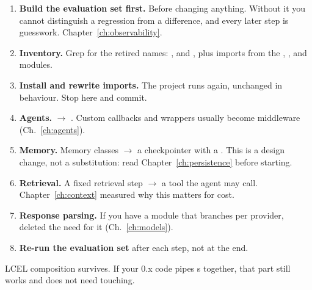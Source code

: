 \begin{enumerate}[leftmargin=1.4em]
\item \textbf{Build the evaluation set first.} Before changing anything. Without
      it you cannot distinguish a regression from a difference, and every later
      step is guesswork. Chapter~\ref{ch:observability}.
\item \textbf{Inventory.} Grep for the retired names: ,
       and , plus imports from the
      , ,  and 
      modules.
\item \textbf{Install  and rewrite imports.} The project
      runs again, unchanged in behaviour. Stop here and commit.
\item \textbf{Agents.}  $\rightarrow$ .
      Custom callbacks and wrappers usually become middleware
      (Ch.~\ref{ch:agents}).
\item \textbf{Memory.} Memory classes $\rightarrow$ a checkpointer with a
      . This is a design change, not a substitution: read
      Chapter~\ref{ch:persistence} before starting.
\item \textbf{Retrieval.} A fixed retrieval step $\rightarrow$ a tool the agent
      may call. Chapter~\ref{ch:context} measured why this matters for cost.
\item \textbf{Response parsing.} If you have a module that branches per provider,
       deleted the need for it
      (Ch.~\ref{ch:models}).
\item \textbf{Re-run the evaluation set} after each step, not at the end.
\end{enumerate}

\begin{note}
LCEL composition survives. If your 0.x code pipes s together, that
part still works and does not need touching.
\end{note}

